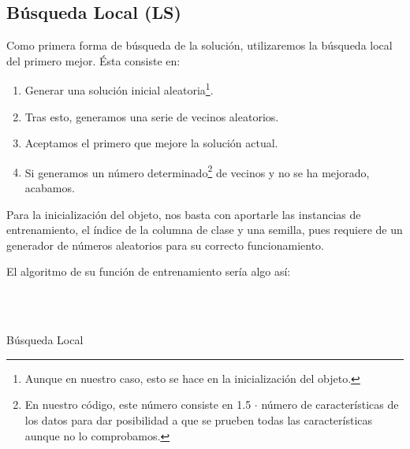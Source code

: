 \documentclass[a4paper, 11pt]{article}
\begin{document}
		\subsection{Búsqueda Local (\textbf{LS})}
			Como primera forma de búsqueda de la solución, utilizaremos la búsqueda local del primero
			mejor. Ésta consiste en:
				\begin{enumerate}
					\item Generar una solución inicial aleatoria\footnote{Aunque en nuestro caso, esto
					se hace en la inicialización del objeto.}.
					\item Tras esto, generamos una serie de vecinos aleatorios.
					\item Aceptamos el primero que mejore la solución actual.
					\item Si generamos un número determinado\footnote{En nuestro código, este número
					consiste en 1.5 $\cdot$ número de características de los datos para dar posibilidad
					a que se prueben todas las características aunque no lo comprobamos.} de vecinos y
					no se ha mejorado, acabamos.
				\end{enumerate}

			Para la inicialización del objeto, nos basta con aportarle las instancias de entrenamiento,
			el índice de la columna de clase y una semilla, pues requiere de un generador de números
			aleatorios para su correcto funcionamiento.

			El algoritmo de su función de entrenamiento sería algo así:
			
			\begin{algorithm}[H]
				\begin{algorithmic}[1]
					\REQUIRE \ \\
							 \

					
				     	
				     	\ELSE
				     	\ENDIF
					\ENDWHILE
				\end{algorithmic}
			\caption{Búsqueda Local}
			\label{LS}
			\end{algorithm}			
\end{document}
